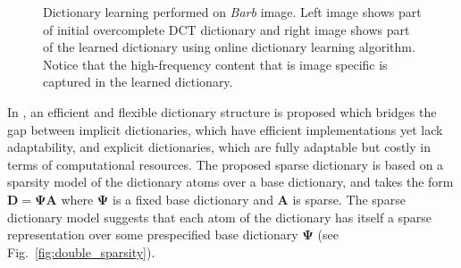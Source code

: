 \documentclass[journal]{IEEEtran}
\begin{document}
%
\begin{figure}[tbp]
	\centering
	
	
	\caption{Dictionary learning performed on \textit{Barb} image. Left image shows part of initial overcomplete DCT dictionary and right image shows part of the learned dictionary using online dictionary learning algorithm. Notice that the high-frequency content that is image specific is captured in the learned dictionary.}
	
	\label{fig:flip_test_reconstruction}
\end{figure}



In \cite{Rubinstein2010}, an efficient and flexible dictionary structure is proposed which bridges the gap between implicit dictionaries, which have efficient implementations yet lack adaptability, and explicit dictionaries, which are fully adaptable but costly in terms of computational resources. The proposed sparse dictionary is based on a sparsity model of the dictionary atoms over a base dictionary, and takes the form $\boldsymbol{D}=\boldsymbol{\Psi}\boldsymbol{A}$ where $\boldsymbol{\Psi}$ is a fixed base dictionary and $\boldsymbol{A}$ is sparse. The sparse dictionary model suggests that each atom of the dictionary has itself a sparse representation over some prespecified base dictionary $\boldsymbol{\Psi}$ (see Fig.~\ref{fig:double_sparsity}).
\end{document}
